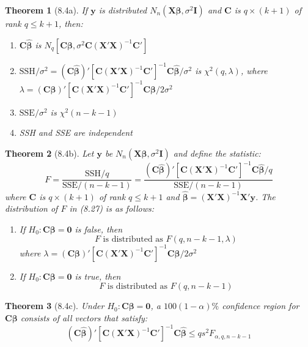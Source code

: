 \documentclass{article}
\newtheorem{theorem}{Theorem}[section]
\begin{document}
\begin{theorem}[8.4a]
If $\mathbf{y}$ is distributed $N_n(\mathbf{X}\boldsymbol{\beta}, \sigma^2\mathbf{I})$ and $\mathbf{C}$ is $q \times (k+1)$ of rank $q \leq k+1$, then:
\begin{enumerate}[label=(\roman*)]
\item $\mathbf{C}\hat{\boldsymbol{\beta}}$ is $N_q[\mathbf{C}\boldsymbol{\beta}, \sigma^2\mathbf{C}(\mathbf{X}'\mathbf{X})^{-1}\mathbf{C}']$
\item $\text{SSH}/\sigma^2 = (\mathbf{C}\hat{\boldsymbol{\beta}})'[\mathbf{C}(\mathbf{X}'\mathbf{X})^{-1}\mathbf{C}']^{-1}\mathbf{C}\hat{\boldsymbol{\beta}}/\sigma^2$ is $\chi^2(q,\lambda)$, where $\lambda = (\mathbf{C}\boldsymbol{\beta})'[\mathbf{C}(\mathbf{X}'\mathbf{X})^{-1}\mathbf{C}']^{-1}\mathbf{C}\boldsymbol{\beta}/2\sigma^2$
\item $\text{SSE}/\sigma^2$ is $\chi^2(n-k-1)$
\item SSH and SSE are independent
\end{enumerate}
\end{theorem}

\begin{theorem}[8.4b]
Let $\mathbf{y}$ be $N_n(\mathbf{X}\boldsymbol{\beta}, \sigma^2\mathbf{I})$ and define the statistic:
\[F = \frac{\text{SSH}/q}{\text{SSE}/(n-k-1)} = \frac{(\mathbf{C}\hat{\boldsymbol{\beta}})'[\mathbf{C}(\mathbf{X}'\mathbf{X})^{-1}\mathbf{C}']^{-1}\mathbf{C}\hat{\boldsymbol{\beta}}/q}{\text{SSE}/(n-k-1)}\]
where $\mathbf{C}$ is $q \times (k+1)$ of rank $q \leq k+1$ and $\hat{\boldsymbol{\beta}} = (\mathbf{X}'\mathbf{X})^{-1}\mathbf{X}'\mathbf{y}$. The distribution of $F$ in (8.27) is as follows:
\begin{enumerate}[label=(\roman*)]
\item If $H_0: \mathbf{C}\boldsymbol{\beta} = \mathbf{0}$ is false, then
\[F \text{ is distributed as } F(q,n-k-1,\lambda)\]
where $\lambda = (\mathbf{C}\boldsymbol{\beta})'[\mathbf{C}(\mathbf{X}'\mathbf{X})^{-1}\mathbf{C}']^{-1}\mathbf{C}\boldsymbol{\beta}/2\sigma^2$

\item If $H_0: \mathbf{C}\boldsymbol{\beta} = \mathbf{0}$ is true, then
\[F \text{ is distributed as } F(q,n-k-1)\]
\end{enumerate}
\end{theorem}

\begin{theorem}[8.4c]
Under $H_0: \mathbf{C}\boldsymbol{\beta} = \mathbf{0}$, a $100(1-\alpha)\%$ confidence region for $\mathbf{C}\boldsymbol{\beta}$ consists of all vectors that satisfy:
\[(\mathbf{C}\hat{\boldsymbol{\beta}})'[\mathbf{C}(\mathbf{X}'\mathbf{X})^{-1}\mathbf{C}']^{-1}\mathbf{C}\hat{\boldsymbol{\beta}} \leq qs^2F_{\alpha,q,n-k-1}\]
\end{theorem}
\end{document}
